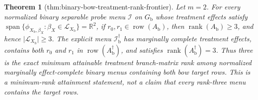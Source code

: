 \documentclass{article}
\newtheorem{theorem}{Theorem}
\begin{document}
\begin{theorem}[thm:binary-bow-treatment-rank-frontier]\label{thm:binary-bow-treatment-rank-frontier}
Let \(m=2\).  For every normalized binary separable probe menu \(\mathcal I\)
on \(G_{\mathrm b}\) whose treatment effects satisfy
\(\operatorname{span}\{\phi_{X_{\mathrm b},\beta_X}:\beta_X\in
\mathcal L_{X_{\mathrm b}}\}=\mathbb R^2\), if
\(r_0,r_1\in\operatorname{row}(A_{\mathrm b})\), then
\(\operatorname{rank}(A_{\mathrm b})\geq 3\), and hence
\(\lvert\mathcal L_{X_{\mathrm b}}\rvert\geq3\).  The explicit menu
\(\mathcal I_{\mathrm b}^{\dagger}\) has marginally complete treatment
effects, contains both \(r_0\) and \(r_1\) in
\(\operatorname{row}(A_{\mathrm b}^{\dagger})\), and satisfies
\(\operatorname{rank}(A_{\mathrm b}^{\dagger})=3\).  Thus three is the exact
minimum attainable treatment branch-matrix rank among normalized marginally
effect-complete binary menus containing both bow target rows.  This is a
minimum-rank attainment statement, not a claim that every rank-three menu
contains the target rows.
\end{theorem}
\end{document}
